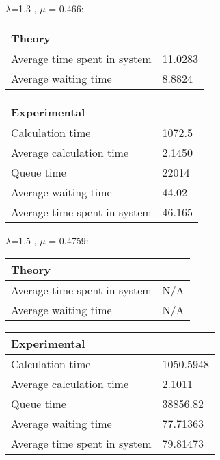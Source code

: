 \begin{minipage}{\linewidth}
   $\lambda$=1.3 , $\mu$ = 0.466:

    \bigskip
    \begin{minipage}{0.45\linewidth}
        \begin{tabular}{|l|l|}
            \hline
            Theory & \\
            \hline
            Average time spent in system & 11.0283 \\
            Average waiting time & 8.8824 \\
            \hline
        \end{tabular}
    \end{minipage}
    \begin{minipage}{0.45\linewidth}
        \begin{tabular}{|l|l|}
            \hline
            Experimental & \\
            \hline
            Calculation time & 1072.5 \\
            Average calculation time & 2.1450 \\
            Queue time & 22014 \\
            Average waiting time & 44.02 \\
            Average time spent in system & 46.165 \\
            \hline
        \end{tabular}
    \end{minipage}
    \bigskip
\end{minipage}

\begin{minipage}{\linewidth}
   $\lambda$=1.5 , $\mu$ = 0.4759:

    \bigskip
    \begin{minipage}{0.45\linewidth}
        \begin{tabular}{|l|l|}
            \hline
            Theory & \\
            \hline
            Average time spent in system & N/A \\
            Average waiting time & N/A \\
            \hline
        \end{tabular}
    \end{minipage}
    \begin{minipage}{0.45\linewidth}
        \begin{tabular}{|l|l|}
            \hline
            Experimental & \\
            \hline
            Calculation time & 1050.5948 \\
            Average calculation time & 2.1011 \\
            Queue time & 38856.82 \\
            Average waiting time & 77.71363 \\
            Average time spent in system & 79.81473 \\
            \hline
        \end{tabular}
    \end{minipage}
    \bigskip
\end{minipage}


